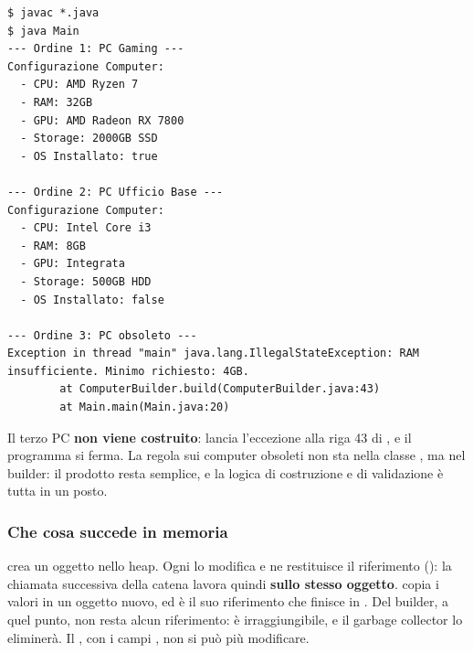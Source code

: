 \begin{lstlisting}[style=shell, name=Terminale]
$ javac *.java
$ java Main
--- Ordine 1: PC Gaming ---
Configurazione Computer:
  - CPU: AMD Ryzen 7
  - RAM: 32GB
  - GPU: AMD Radeon RX 7800
  - Storage: 2000GB SSD
  - OS Installato: true

--- Ordine 2: PC Ufficio Base ---
Configurazione Computer:
  - CPU: Intel Core i3
  - RAM: 8GB
  - GPU: Integrata
  - Storage: 500GB HDD
  - OS Installato: false

--- Ordine 3: PC obsoleto ---
Exception in thread "main" java.lang.IllegalStateException: RAM insufficiente. Minimo richiesto: 4GB.
        at ComputerBuilder.build(ComputerBuilder.java:43)
        at Main.main(Main.java:20)
\end{lstlisting}

Il terzo PC \textbf{non viene costruito}:  lancia l'eccezione alla riga 43 di , e
il programma si ferma. La regola sui computer obsoleti non sta nella classe , ma nel builder: il prodotto
resta semplice, e la logica di costruzione e di validazione è tutta in un posto.

\subsubsection*{Che cosa succede in memoria}

 crea un oggetto nello heap. Ogni  lo modifica e ne restituisce il
riferimento (): la chiamata successiva della catena lavora quindi \textbf{sullo stesso oggetto}.
 copia i valori in un oggetto  nuovo, ed è il suo riferimento che finisce in .
Del builder, a quel punto, non resta alcun riferimento: è irraggiungibile, e il garbage collector lo eliminerà. Il
, con i campi , non si può più modificare.

\begin{center}
\end{center}

